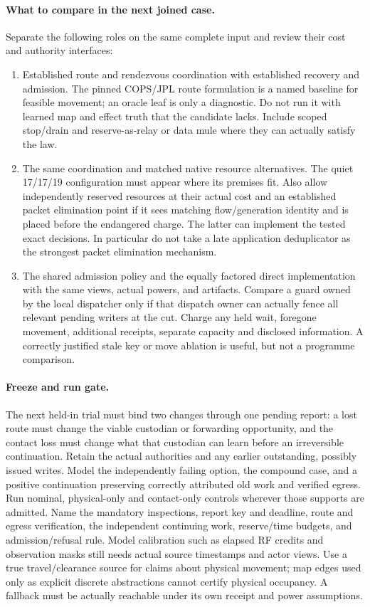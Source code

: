 \documentclass{article}
\begin{document}
\paragraph{What to compare in the next joined case.}
Separate the following roles on the same complete input and review
their cost and authority interfaces:
\begin{enumerate}
\item Established route and rendezvous coordination with established
recovery and admission. The pinned COPS/JPL route formulation is
a named baseline for feasible movement; an oracle leaf is only a
diagnostic. Do not run it with learned map and effect truth that
the candidate lacks. Include scoped stop/drain and reserve-as-relay
or data mule where they can actually satisfy the law.
\item The same coordination and matched native resource alternatives.
The quiet 17/17/19 configuration must appear where its premises
fit. Also allow independently reserved resources at their actual
cost and an established packet elimination point if it sees matching
flow/generation identity and is placed before the endangered charge.
The latter can implement the tested exact decisions. In particular
do not take a late application deduplicator as the strongest
packet elimination mechanism.
\item The shared admission policy and the equally factored direct
implementation with the same views, actual powers, and artifacts.
Compare a guard owned by the local dispatcher only if that dispatch
owner can actually fence all relevant pending writers at the cut.
Charge any held wait, foregone movement, additional receipts, separate
capacity and disclosed information. A correctly justified stale
key or move ablation is useful, but not a programme comparison.
\end{enumerate}

\paragraph{Freeze and run gate.}
The next held-in trial must bind two changes through one pending
report: a lost route must change the viable custodian or forwarding
opportunity, and the contact loss must change what that custodian
can learn before an irreversible continuation. Retain the actual
authorities and any earlier outstanding, possibly issued writes.
Model the independently failing option, the compound case, and
a positive continuation preserving correctly attributed old work
and verified egress. Run nominal, physical-only and contact-only
controls wherever those supports are admitted. Name the mandatory
inspections, report key and deadline, route and egress verification,
the independent continuing work, reserve/time budgets, and
admission/refusal rule. Model calibration such as elapsed RF
credits and observation masks still needs actual source timestamps
and actor views. Use a true travel/clearance source for claims about
physical movement; map edges used only as explicit discrete
abstractions cannot certify physical occupancy. A fallback must be
actually reachable under its own receipt and power assumptions.
\end{document}
